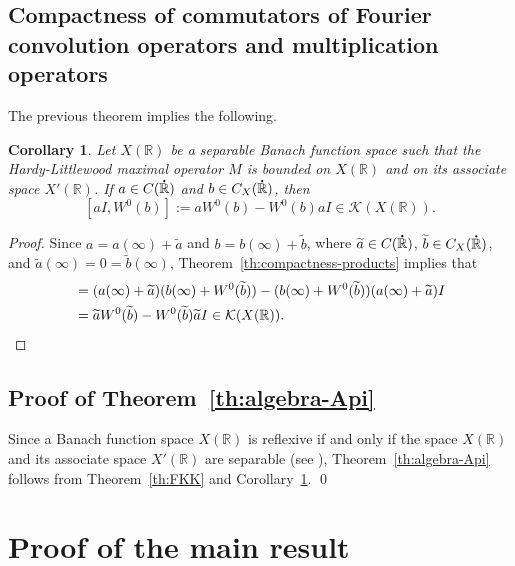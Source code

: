 \documentclass[reqno]{amsproc}
\newcommand{\dR}{{\bf\dot{\R}}}
\newcommand{\R}{\mathbb{R}}
\newtheorem{corollary}[theorem]{Corollary}
\theoremstyle{definition}
\theoremstyle{remark}
\numberwithin{equation}{section}
\begin{document}
\subsection{Compactness of commutators of Fourier convolution
operators and multiplication operators} 
The previous theorem implies the following.
\begin{corollary}\label{co:compactness-commutators}
Let $X(\R)$ be a separable Banach function space such that the Hardy-Littlewood 
maximal operator $M$ is bounded on $X(\R)$ and on its associate 
space $X'(\R)$. If $a \in C(\dR)$ and $b \in C_X(\dR)$, then 
\[
[aI, W^0(b)] := aW^0(b) - W^0(b)aI \in \mathcal{K}(X(\mathbb{R})).
\]
\end{corollary}
\begin{proof}
Since $a = a(\infty) + \widetilde{a}$ and $b = b(\infty) + \widetilde{b}$, 
where $\widetilde{a} \in C(\dR)$, $\widetilde{b} \in C_X(\dR)$, and 
$\widetilde{a}(\infty) = 0 = \widetilde{b}(\infty)$,
Theorem~\ref{th:compactness-products} implies that
\begin{align*}
[aI, W^0(b)] 
&= 
(a(\infty) + \widetilde{a}) (b(\infty) + W^0(\widetilde{b})) 
- 
(b(\infty) + W^0(\widetilde{b}))(a(\infty) + \widetilde{a}) I 
\\
& = 
\widetilde{a} W^0(\widetilde{b}) - W^0(\widetilde{b}) \widetilde{a}I 
\in \mathcal{K}(X(\mathbb{R})).
\qedhere
\end{align*}
\end{proof}
\subsection{Proof of Theorem~\ref{th:algebra-Api}}
Since a Banach function space $X(\R)$ is reflexive if and only if the space 
$X(\R)$ and its associate space $X'(\R)$ are separable 
(see \cite[Chap.~1, Corollaries 4.4 and 5.6]{BS88}), 
Theorem~\ref{th:algebra-Api} follows from Theorem~\ref{th:FKK} and
Corollary~\ref{co:compactness-commutators}.
\qed

\section{Proof of the main result}
\label{sec:main-proof}
\end{document}
